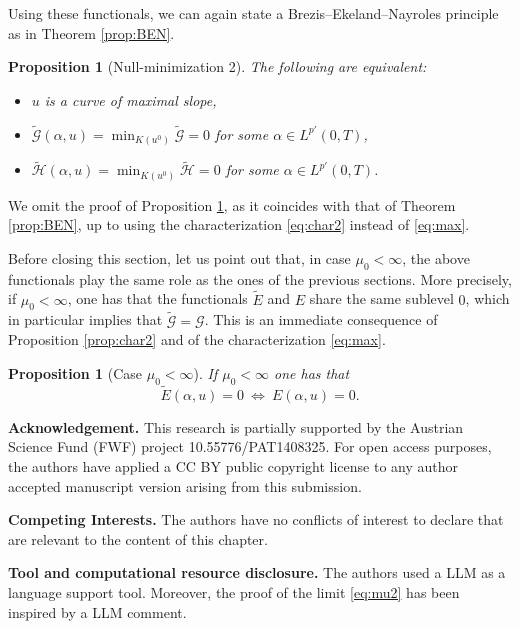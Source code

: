 \documentclass[reqno]{amsart}
\newcommand{\GG}{{\mathcal G}}
\newcommand{\HH}{{\mathcal H}}
\newtheorem{proposition}[theorem]{Proposition}
\begin{document}
Using these functionals, we can again state a
Brezis--Ekeland--Nayroles principle as in Theorem \ref{prop:BEN}.


 \begin{proposition}[Null-minimization 2]\label{prop:BEN2}
    The following are equivalent:
   \begin{itemize}
   \item[\rm (i)]\quad $u$ is a curve of maximal slope,\vspace{0.6mm}
     \item[\rm (ii)]\quad  $
  \tilde \GG(\alpha,u)=\min_{K(u^0)} \tilde \GG=0$ for some $\alpha \in
  L^{p'}(0,T)$,
  \item[\rm (iii)] \quad  $
  \tilde \HH(\alpha,u)=\min_{K(u^0)} \tilde \HH=0$ for some $\alpha \in
  L^{p'}(0,T)$.
   \end{itemize}  
 \end{proposition}

 We omit the proof of Proposition  \ref{prop:BEN2},  as it coincides with  that  of Theorem
 \ref{prop:BEN}, up to using the characterization \eqref{eq:char2} instead of
 \eqref{eq:max}.



Before closing this section, let us point out that, in case
$\mu_0<\infty$, the above functionals  play the same role as  the ones of
the previous sections. More  precisely, if $\mu_0<\infty$, one has that the functionals $\tilde E$ and $E$ share the same sublevel
$0$, which in particular implies that $\tilde \GG = \GG$. This is an immediate consequence of
Proposition  \ref{prop:char2} and  of the characterization \eqref{eq:max}.  

\begin{proposition}[Case $\mu_0 <\infty$]
   If $\mu_0 <\infty$  one has
  that
  $$\tilde E(\alpha,u)  = 0 \ \Leftrightarrow \  E(\alpha,u)=0.$$
\end{proposition}


\textbf{Acknowledgement.}
 This research is partially supported by the Austrian Science Fund (FWF) project
 10.55776/PAT1408325.
 For open access purposes, the authors have applied a CC BY public
copyright license to any author accepted manuscript version arising
from this submission.

\textbf{Competing Interests.}
The authors have no conflicts of interest to declare that are relevant to the content of this chapter.

\textbf{Tool and computational resource disclosure.}
The authors used a LLM as a language support tool. Moreover, the proof of the limit \eqref{eq:mu2} has been inspired by a LLM comment.
\end{document}
